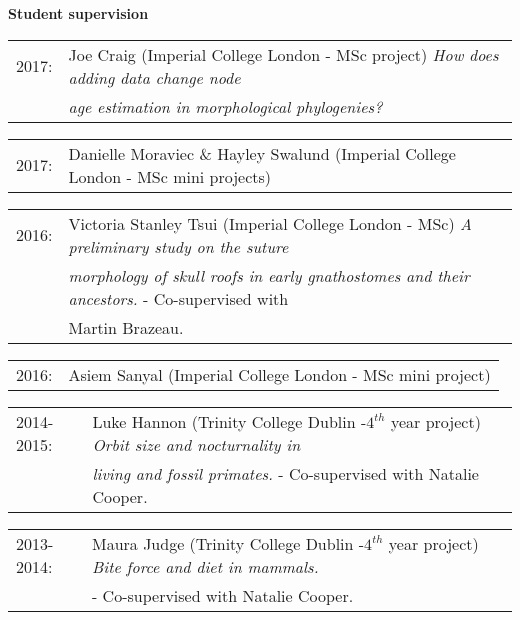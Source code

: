 \documentclass[10pt,a4paper]{article}
\begin{document}
{\bigskip

\raggedright\textbf{Student supervision}\\[1.5ex]
\begin{tabular}{ll}
2017: & Joe Craig (Imperial College London - MSc project) \textit{How does adding data change node}\\
     & \textit{age estimation in morphological phylogenies?}\\
\end{tabular}
\begin{tabular}{ll}
2017: & Danielle Moraviec \& Hayley Swalund (Imperial College London - MSc mini projects)\\
\end{tabular}
\begin{tabular}{ll}
2016: & Victoria Stanley Tsui (Imperial College London - MSc) \textit{A preliminary study on the suture}\\
      & \textit{morphology of skull roofs in early gnathostomes and their ancestors.} - Co-supervised with\\
      & Martin Brazeau.\\
\end{tabular}
\begin{tabular}{ll}
2016: & Asiem Sanyal (Imperial College London - MSc mini project)\\
\end{tabular}
\begin{tabular}{ll}
2014-2015: & Luke Hannon (Trinity College Dublin -$4^{th}$ year project) \textit{Orbit size and nocturnality in}\\
      & \textit{living and fossil primates.} - Co-supervised with Natalie Cooper.\\
\end{tabular}
\begin{tabular}{ll}
2013-2014: & Maura Judge (Trinity College Dublin -$4^{th}$ year project) \textit{Bite force and diet in mammals.}\\
           &  - Co-supervised with Natalie Cooper.\\
\end{tabular}
\bigskip

}
\end{document}
